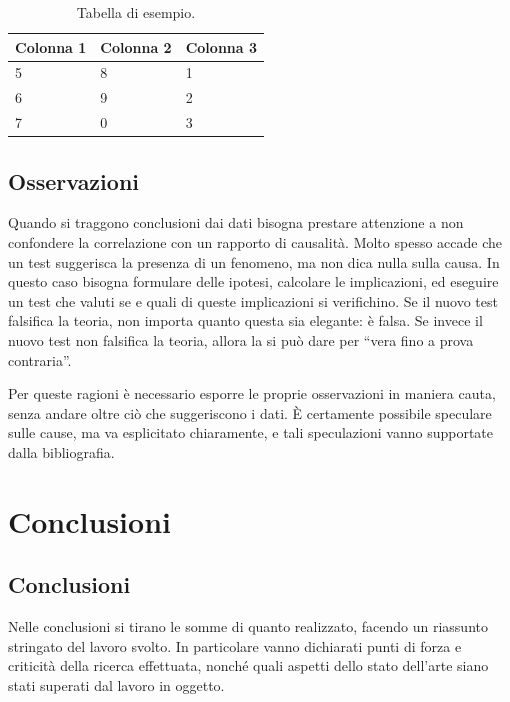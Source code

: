 \documentclass[12pt]{report}
\begin{document}
\begin{table}
	\centering
    \begin{tabular}{|l|l|l|}
	\hline
	Colonna 1 & Colonna 2 & Colonna 3 \\ \hline
	5         & 8         & 1         \\
	6         & 9         & 2         \\
	7         & 0         & 3         \\ \hline
\end{tabular}
	\caption{Tabella di esempio.}
	\label{tab:sample}
\end{table}

\section{Osservazioni}

Quando si traggono conclusioni dai dati bisogna prestare attenzione a non confondere la correlazione con un rapporto di causalità. Molto spesso accade che un test suggerisca la presenza di un fenomeno, ma non dica nulla sulla causa. In questo caso bisogna formulare delle ipotesi, calcolare le implicazioni, ed eseguire un test che valuti se e quali di queste implicazioni si verifichino. Se il nuovo test falsifica la teoria, non importa quanto questa sia elegante: è falsa. Se invece il nuovo test non falsifica la teoria, allora la si può dare per ``vera fino a prova contraria''.

Per queste ragioni è necessario esporre le proprie osservazioni in maniera cauta, senza andare oltre ciò che suggeriscono i dati. \`E certamente possibile speculare sulle cause, ma va esplicitato chiaramente, e tali speculazioni vanno supportate dalla bibliografia.

% 
% 

\chapter{Conclusioni}
\label{cap6}

\section{Conclusioni}

Nelle conclusioni si tirano le somme di quanto realizzato, facendo un riassunto stringato del lavoro svolto. In particolare vanno dichiarati punti di forza e criticità della ricerca effettuata, nonché quali aspetti dello stato dell'arte siano stati superati dal lavoro in oggetto.
\end{document}
